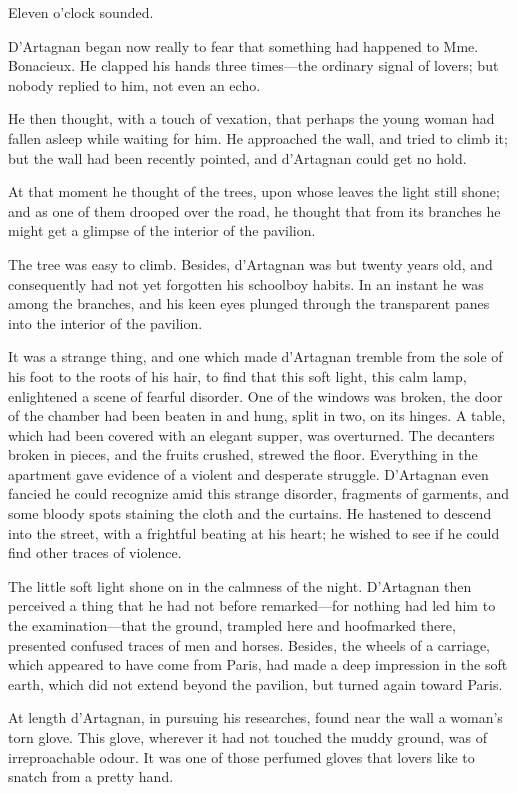 Eleven o'clock sounded. 

D'Artagnan began now really to fear that something had happened to Mme. Bonacieux. He clapped his hands three times---the ordinary signal of lovers; but nobody replied to him, not even an echo. 

He then thought, with a touch of vexation, that perhaps the young woman had fallen asleep while waiting for him. He approached the wall, and tried to climb it; but the wall had been recently pointed, and d'Artagnan could get no hold. 

At that moment he thought of the trees, upon whose leaves the light still shone; and as one of them drooped over the road, he thought that from its branches he might get a glimpse of the interior of the pavilion. 

The tree was easy to climb. Besides, d'Artagnan was but twenty years old, and consequently had not yet forgotten his schoolboy habits. In an instant he was among the branches, and his keen eyes plunged through the transparent panes into the interior of the pavilion. 

It was a strange thing, and one which made d'Artagnan tremble from the sole of his foot to the roots of his hair, to find that this soft light, this calm lamp, enlightened a scene of fearful disorder. One of the windows was broken, the door of the chamber had been beaten in and hung, split in two, on its hinges. A table, which had been covered with an elegant supper, was overturned. The decanters broken in pieces, and the fruits crushed, strewed the floor. Everything in the apartment gave evidence of a violent and desperate struggle. D'Artagnan even fancied he could recognize amid this strange disorder, fragments of garments, and some bloody spots staining the cloth and the curtains. He hastened to descend into the street, with a frightful beating at his heart; he wished to see if he could find other traces of violence. 

The little soft light shone on in the calmness of the night. D'Artagnan then perceived a thing that he had not before remarked---for nothing had led him to the examination---that the ground, trampled here and hoofmarked there, presented confused traces of men and horses. Besides, the wheels of a carriage, which appeared to have come from Paris, had made a deep impression in the soft earth, which did not extend beyond the pavilion, but turned again toward Paris. 

At length d'Artagnan, in pursuing his researches, found near the wall a woman's torn glove. This glove, wherever it had not touched the muddy ground, was of irreproachable odour. It was one of those perfumed gloves that lovers like to snatch from a pretty hand. 

